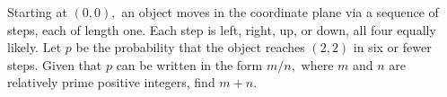 Starting at $(0,0),$ an object moves in the coordinate plane via a sequence of steps, each of length one.  Each step is left, right, up, or down, all four equally likely.  Let $p$ be the probability that the object reaches $(2,2)$ in six or fewer steps.  Given that $p$ can be written in the form $m/n,$ where $m$ and $n$ are relatively prime positive integers, find $m+n.$